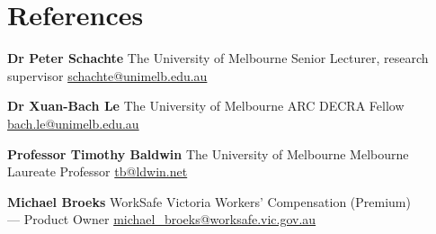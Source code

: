 \documentclass[9pt]{extarticle}
\newcommand{\reference}[5]{
    \textbf{#1} \newline
    {\footnotesize #2} \newline
    #3 \newline
    \href{mailto:#4}{#4} \newline
}
\begin{document}
\begin{minipage}[t]{.31\textwidth}
\medskip

\section{References}

\reference{Dr Peter Schachte}
{The University of Melbourne}
{Senior Lecturer, research supervisor}
{schachte@unimelb.edu.au}
\vspace

\reference{Dr Xuan-Bach Le}
{The University of Melbourne}
{ARC DECRA Fellow}
{bach.le@unimelb.edu.au}
\vspace

\reference{Professor Timothy Baldwin}
{The University of Melbourne}
{Melbourne Laureate Professor}
{tb@ldwin.net}
\vspace

\reference{Michael Broeks}
{WorkSafe Victoria}
{Workers' Compensation (Premium) \\ --- Product Owner}
{michael\_broeks@worksafe.vic.gov.au}
\vspace


\end{minipage}\hfill
\end{document}
